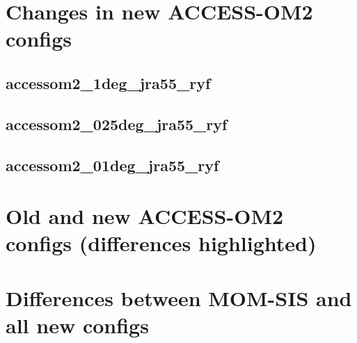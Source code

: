 \documentclass[10pt]{article}
\newcommand{\nmldiffer}[1]{#1} %
\newcommand{\doscript}[1]{{\footnotesize\textsf{}}}
\begin{document}
\newpage
\section{Changes in new ACCESS-OM2 configs}
\subsection{accessom2_1deg_jra55_ryf}
\doscript{/Users/andy/anaconda/bin/python3 /Users/andy/bin/nmltab.py -d --format latex original/hogg_accessom2_1deg_jra55_ryf_input.nml new_accessom2_1deg_jra55_ryf_input.nml }
\newpage
\subsection{accessom2_025deg_jra55_ryf}
\doscript{/Users/andy/anaconda/bin/python3 /Users/andy/bin/nmltab.py -d --format latex original/kiss_accessom2_025deg_jra55_ryf_input.nml new_accessom2_025deg_jra55_ryf_input.nml}
\subsection{accessom2_01deg_jra55_ryf}
\doscript{/Users/andy/anaconda/bin/python3 /Users/andy/bin/nmltab.py -d --format latex original/hogg_accessom2_01deg_jra55_ryf_input.nml new_accessom2_01deg_jra55_ryf_input.nml}

\newpage
\section{Old and new ACCESS-OM2 configs (differences highlighted)}
\renewcommand{\nmldiffer}[1]{\colorbox{hilite}{#1}}\setlength{\fboxsep}{0pt} %
\doscript{/Users/andy/anaconda/bin/python3 /Users/andy/bin/nmltab.py --format latex original/hogg_accessom2_1deg_jra55_ryf_input.nml new_accessom2_1deg_jra55_ryf_input.nml original/kiss_accessom2_025deg_jra55_ryf_input.nml new_accessom2_025deg_jra55_ryf_input.nml original/hogg_accessom2_01deg_jra55_ryf_input.nml new_accessom2_01deg_jra55_ryf_input.nml}

\newpage
\section{Differences between MOM-SIS and all new configs}
\doscript{/Users/andy/anaconda/bin/python3 /Users/andy/bin/nmltab.py -d --format latex original/fabio_momsis1_input.nml original/paul_momsis025_input.nml original/fanghua_momsis01v5KDS75_WOA13_input.nml new_accessom2_1deg_jra55_ryf_input.nml new_accessom2_025deg_jra55_ryf_input.nml new_accessom2_01deg_jra55_ryf_input.nml}
\end{document}
